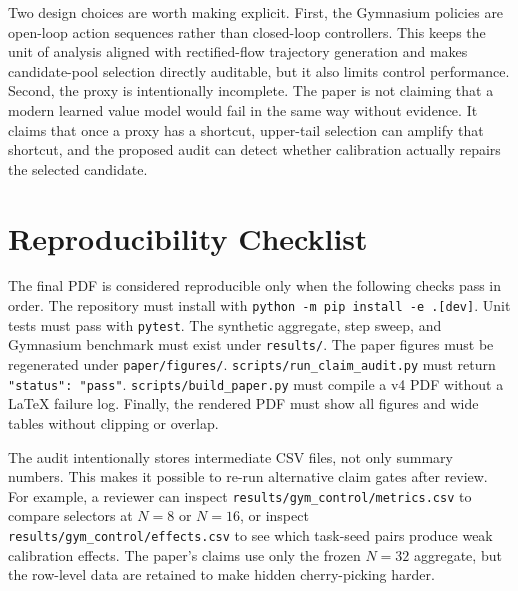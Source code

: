 \documentclass[10pt]{article}
\begin{document}
Two design choices are worth making explicit. First, the Gymnasium policies are open-loop action sequences rather than closed-loop controllers. This keeps the unit of analysis aligned with rectified-flow trajectory generation and makes candidate-pool selection directly auditable, but it also limits control performance. Second, the proxy is intentionally incomplete. The paper is not claiming that a modern learned value model would fail in the same way without evidence. It claims that once a proxy has a shortcut, upper-tail selection can amplify that shortcut, and the proposed audit can detect whether calibration actually repairs the selected candidate.

\section{Reproducibility Checklist}

The final PDF is considered reproducible only when the following checks pass in order. The repository must install with \texttt{python -m pip install -e .[dev]}. Unit tests must pass with \texttt{pytest}. The synthetic aggregate, step sweep, and Gymnasium benchmark must exist under \texttt{results/}. The paper figures must be regenerated under \texttt{paper/figures/}. \texttt{scripts/run\_claim\_audit.py} must return \texttt{"status": "pass"}. \texttt{scripts/build\_paper.py} must compile a v4 PDF without a LaTeX failure log. Finally, the rendered PDF must show all figures and wide tables without clipping or overlap.

The audit intentionally stores intermediate CSV files, not only summary numbers. This makes it possible to re-run alternative claim gates after review. For example, a reviewer can inspect \texttt{results/gym\_control/\allowbreak metrics.csv} to compare selectors at \(N=8\) or \(N=16\), or inspect \texttt{results/gym\_control/\allowbreak effects.csv} to see which task-seed pairs produce weak calibration effects. The paper's claims use only the frozen \(N=32\) aggregate, but the row-level data are retained to make hidden cherry-picking harder.
\end{document}
